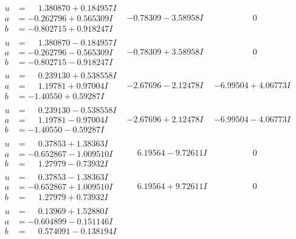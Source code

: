 \documentclass[1p]{elsarticle_modified}
\theoremstyle{definition}
\begin{document}
$$\begin{array}{c|c|c}
\begin{aligned}
u &= \phantom{-}1.380870 + 0.184957 I \\
a &= -0.262796 + 0.565309 I \\
b &= -0.802715 + 0.918247 I\end{aligned}
 & -0.78309 - 3.58958 I & \phantom{-0.000000 } 0 \\ \hline\begin{aligned}
u &= \phantom{-}1.380870 - 0.184957 I \\
a &= -0.262796 - 0.565309 I \\
b &= -0.802715 - 0.918247 I\end{aligned}
 & -0.78309 + 3.58958 I & \phantom{-0.000000 } 0 \\ \hline\begin{aligned}
u &= \phantom{-}0.239130 + 0.538558 I \\
a &= \phantom{-}1.19781 + 0.97004 I \\
b &= -1.40550 + 0.59287 I\end{aligned}
 & -2.67696 - 2.12478 I & -6.99504 + 4.06773 I \\ \hline\begin{aligned}
u &= \phantom{-}0.239130 - 0.538558 I \\
a &= \phantom{-}1.19781 - 0.97004 I \\
b &= -1.40550 - 0.59287 I\end{aligned}
 & -2.67696 + 2.12478 I & -6.99504 - 4.06773 I \\ \hline\begin{aligned}
u &= \phantom{-}0.37853 + 1.38363 I \\
a &= -0.652867 - 1.009510 I \\
b &= \phantom{-}1.27979 - 0.73932 I\end{aligned}
 & \phantom{-}6.19564 - 9.72611 I & \phantom{-0.000000 } 0 \\ \hline\begin{aligned}
u &= \phantom{-}0.37853 - 1.38363 I \\
a &= -0.652867 + 1.009510 I \\
b &= \phantom{-}1.27979 + 0.73932 I\end{aligned}
 & \phantom{-}6.19564 + 9.72611 I & \phantom{-0.000000 } 0 \\ \hline\begin{aligned}
u &= \phantom{-}0.13969 + 1.52880 I \\
a &= -0.604899 - 0.151146 I \\
b &= \phantom{-}0.574091 - 0.138194 I\end{aligned}

\end{array}$$
\end{document}
